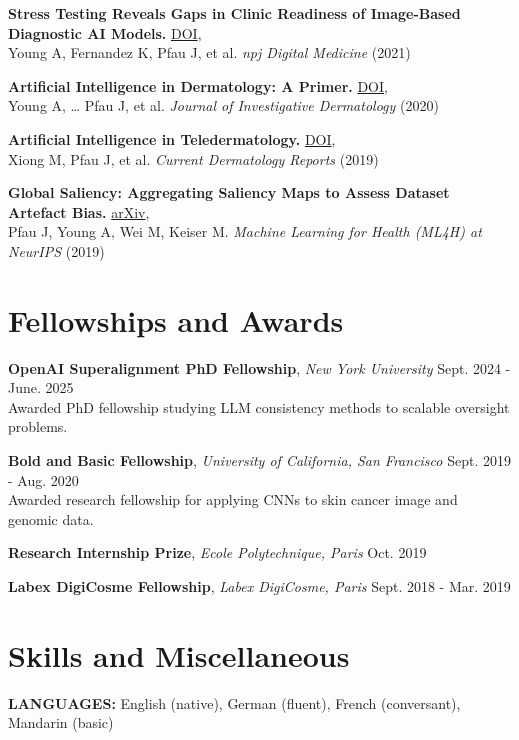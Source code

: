 \documentclass[11pt,letterpaper]{article}
\begin{document}
\textbf{Stress Testing Reveals Gaps in Clinic Readiness of Image-Based Diagnostic AI Models.}
\href{https://doi.org/10.1038/s41746-020-00380-6}{DOI},\\
Young A, Fernandez K, Pfau J, et al. \textit{npj Digital Medicine} (2021)
\vspace{3pt}

\textbf{Artificial Intelligence in Dermatology: A Primer.}
\href{https://doi.org/10.1016/j.jid.2020.02.026}{DOI},\\
Young A, \dots{} Pfau J, et al. \textit{Journal of Investigative Dermatology} (2020)
\vspace{3pt}

\textbf{Artificial Intelligence in Teledermatology.}
\href{https://doi.org/10.1007/s13671-019-0259-8}{DOI},\\
Xiong M, Pfau J, et al. \textit{Current Dermatology Reports} (2019)
\vspace{3pt}

\textbf{Global Saliency: Aggregating Saliency Maps to Assess Dataset Artefact Bias.}
\href{https://doi.org/10.48550/arXiv.1910.07604}{arXiv},\\
Pfau J, Young A, Wei M, Keiser M. \textit{Machine Learning for Health (ML4H) at NeurIPS} (2019)


\section{Fellowships and Awards}

\textbf{OpenAI Superalignment PhD Fellowship}, \textit{New York University} \hfill Sept. 2024 - June. 2025\\
Awarded PhD fellowship studying LLM consistency methods to scalable oversight problems.
\vspace{4pt}

\textbf{Bold and Basic Fellowship}, \textit{University of California, San Francisco} \hfill Sept. 2019 - Aug. 2020\\
Awarded research fellowship for applying CNNs to skin cancer image and genomic data.
\vspace{4pt}

\textbf{Research Internship Prize}, \textit{Ecole Polytechnique, Paris} \hfill Oct. 2019
\vspace{4pt}

\textbf{Labex DigiCosme Fellowship}, \textit{Labex DigiCosme, Paris} \hfill Sept. 2018 - Mar. 2019

\section{Skills and Miscellaneous}

\textbf{LANGUAGES:} English (native), German (fluent), French (conversant), Mandarin (basic)
\end{document}
